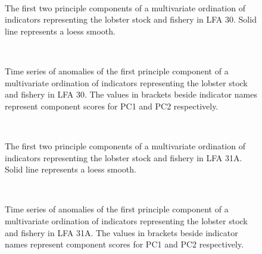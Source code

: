 \documentclass[11pt]{article}
\newcommand{\D}{.}
\newcommand{\e}{/backup/bio_data/bio.lobster/figures/} %
\begin{document}

\begin{figure}
\centering
   \\
                     \caption{The first two principle components of a multivariate ordination of indicators representing the lobster stock and fishery in LFA 30. Solid line represents a loess smooth.}
\end{figure}
\clearpage

\begin{figure}

   \\
                     \caption{Time series of anomalies of the first principle component of a multivariate ordination of indicators representing the lobster stock and fishery in LFA 30. The values in brackets beside indicator names represent component scores for PC1 and PC2 respectively.}

\end{figure}


\begin{figure}
\centering
   \\
                     \caption{The first two principle components of a multivariate ordination of indicators representing the lobster stock and fishery in LFA 31A. Solid line represents a loess smooth.}
\end{figure}
\clearpage

\begin{figure}

   \\
                     \caption{Time series of anomalies of the first principle component of a multivariate ordination of indicators representing the lobster stock and fishery in LFA 31A. The values in brackets beside indicator names represent component scores for PC1 and PC2 respectively.}
\end{figure}
\end{document}

